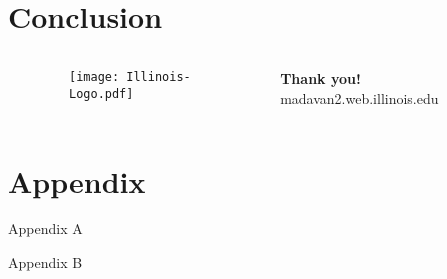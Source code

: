 \documentclass[11pt]{beamer}
\begin{document}


\section{Conclusion} %
\label{sec:conclusion}

\begin{frame}

  \begin{columns}[c]
    \begin{column}{0.1\linewidth}\end{column}
    \begin{column}{0.1\linewidth}
      \begin{figure}[H]
        \texttt{[image: Illinois-Logo.pdf]}
      \end{figure}
    \end{column}
    \begin{column}{0.55\linewidth}
      \vspace{1em}

      {\Huge \bf Thank you!}
      {\Large madavan2.web.illinois.edu}
    \end{column}
    \begin{column}{0.1\linewidth}\end{column}
  \end{columns}
\end{frame}


\section{Appendix} %
\label{sec:appendix}

\begin{frame}{Appendix A}
\end{frame}

\begin{frame}{Appendix B}
\end{frame}
\end{document}
